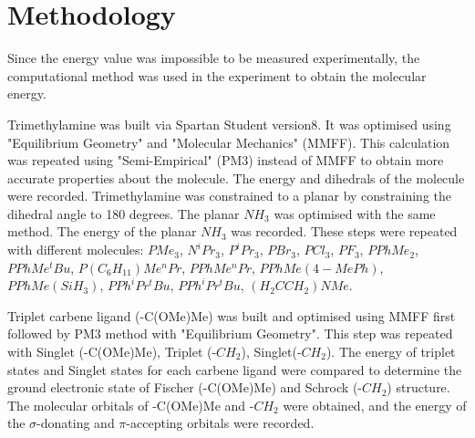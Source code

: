 \documentclass[twocolumn]{article} %
\begin{document}




\section{Methodology}

Since the energy value was impossible to be measured experimentally, the computational method was used in the experiment to obtain the molecular energy. 

Trimethylamine was built via Spartan Student version8. It was optimised using "Equilibrium Geometry" and "Molecular Mechanics" (MMFF). This calculation was repeated using "Semi-Empirical" (PM3) instead of MMFF to obtain more accurate properties about the molecule. The energy and dihedrals of the molecule were recorded. Trimethylamine was constrained to a planar by constraining the dihedral angle to 180 degrees. The planar $NH_3$ was optimised with the same method. The energy of the planar $NH_3$ was recorded. These steps were repeated with different molecules: $PMe_3$, $N^iPr_3$, $P^iPr_3$, $PBr_3$, $PCl_3$, $PF_3$, $PPhMe_2$, $PPhMe^tBu$, $P(C_6H_{11})Me^nPr$, $PPhMe^nPr$, $PPhMe(4-MePh)$, $PPhMe(SiH_3)$, $PPh^iPr^tBu$, $PPh^iPr^tBu$, $(H_2CCH_2)NMe$.

Triplet carbene ligand (-C(OMe)Me) was built and optimised using MMFF first followed by PM3 method with "Equilibrium Geometry". This step was repeated with Singlet (-C(OMe)Me), Triplet (-$CH_2$), Singlet(-$CH_2$). The energy of triplet states and Singlet states for each carbene ligand were compared to determine the ground electronic state of Fischer (-C(OMe)Me) and Schrock (-$CH_2$) structure. The molecular orbitals of -C(OMe)Me and -$CH_2$ were obtained, and the energy of the $\sigma$-donating and $\pi$-accepting orbitals were recorded. 
\end{document}
